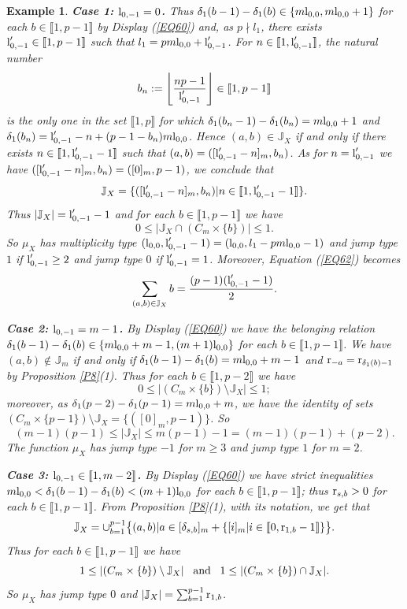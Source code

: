 \documentclass[11pt]{amsart}
\newtheorem{ex}[theorem]{Example}
\def\l{\textup{l}}
\def\r{\textup{r}}
\begin{document}
\begin{ex}
{\bf Case 1: $\l_{0,-1}=0$.} Thus $\delta_1(b-1)-\delta_1(b)\in\{m\l_{0,0},m\l_{0,0}+1\}$ for each $b\in\llbracket1,p-1\rrbracket$ by Display (\ref{EQ60}) and, as $p\nmid l_1$, there exists $\l'_{0,-1}\in\llbracket1,p-1\rrbracket$ such that $l_1=pm\l_{0,0}+\l'_{0,-1}$. For $n\in\llbracket1,\l'_{0,-1}\rrbracket$, the natural number 
\[
b_n:=\left\lfloor\frac{np-1}{\l'_{0,-1}}\right\rfloor\in\llbracket1,p-1\rrbracket
\]
is the only one in the set $\llbracket1,p\rrbracket$ for which $\delta_1(b_n-1)-\delta_1(b_n)=m\l_{0,0}+1$ and $\delta_1(b_n)=\l'_{0,-1}-n+(p-1-b_n)m\l_{0,0}$. Hence $(a,b)\in\mathbb J_X$ if and only if there exists $n\in\llbracket1,\l'_{0,-1}-1\rrbracket$ such that $(a,b)=([\l'_{0,-1}-n]_m,b_n)$. As for $n=\l'_{0,-1}$ we have $([\l'_{0,-1}-n]_m,b_n)=([0]_m,p-1)$, we conclude that
$$\mathbb J_X=\{([\l'_{0,-1}-n]_m,b_n)|n\in\llbracket1,\l'_{0,-1}-1\rrbracket\}.$$
Thus $|\mathbb J_X|=\l'_{0,-1}-1$ and for each $b\in\llbracket1,p-1\rrbracket$ we have 
$$0\le|\mathbb J_X\cap (C_m\times\{b\})|\le 1.$$
So $\mu_X$ has multiplicity type $(\l_{0,0},\l'_{0,-1}-1)=(\l_{0,0},l_1-pm\l_{0,0}-1)$ and jump type $1$ if $\l'_{0,-1}\ge 2$ and jump type $0$ if $\l'_{0,-1}=1$. Moreover, Equation (\ref{EQ62}) becomes
$$\sum_{(a,b)\in\mathbb J_X} b=\frac{(p-1)(\l'_{0,-1}-1)}{2}.$$

{\bf Case 2: $\l_{0,-1}=m-1$.} By Display (\ref{EQ60}) we have the belonging relation $\delta_1(b-1)-\delta_1(b)\in\{m\l_{0,0}+m-1,(m+1)\l_{0,0}\}$ for each $b\in\llbracket1,p-1\rrbracket$. We have $(a,b)\notin\mathbb J_m$ if and only if $\delta_1(b-1)-\delta_1(b)=m\l_{0,0}+m-1$ and $\r_{-a}=\r_{\delta_1(b)-1}$ by Proposition \ref{P8}(1). Thus for each $b\in\llbracket1,p-2\rrbracket$ we have 
$$0\le|(C_m\times\{b\})\setminus \mathbb J_X|\le 1;$$
moreover, as $\delta_1(p-2)-\delta_1(p-1)=m\l_{0,0}+m$, we have the identity of sets $(C_m\times\{p-1\})\setminus \mathbb J_X=\{([0]_m,p-1)\}$.
So 
$$(m-1)(p-1)\le|\mathbb J_X|\le m(p-1)-1=(m-1)(p-1)+(p-2).$$ The function $\mu_X$ has jump type $-1$ for $m\ge 3$ and jump type $1$ for $m=2$.  

{\bf Case 3: $\l_{0,-1}\in\llbracket1,m-2\rrbracket$.} By Display (\ref{EQ60}) we have strict inequalities $m\l_{0,0}<\delta_1(b-1)-\delta_1(b)<(m+1)\l_{0,0}$ for each $b\in\llbracket1,p-1\rrbracket$; thus $\r_{s,b}>0$ for each $b\in\llbracket1,p-1\rrbracket$. From Proposition \ref{P8}(1), with its notation, we get that 
$$\mathbb J_X=\cup_{b=1}^{p-1} \bigl\{(a,b)|a\in [\delta_{s,b}]_m+\{[i]_m|i\in\llbracket0,\r_{1,b}-1\rrbracket\}\bigr\}.$$
Thus for each $b\in\llbracket1,p-1\rrbracket$ we have 
$$1\le|(C_m\times\{b\})\setminus \mathbb J_X|\;\;\;\textup{and}\;\;\;1\le|(C_m\times\{b\})\cap \mathbb J_X|.$$
So $\mu_X$ has jump type $0$ and $|\mathbb J_X|=\sum_{b=1}^{p-1} \r_{1,b}$.


\end{ex}
\end{document}
